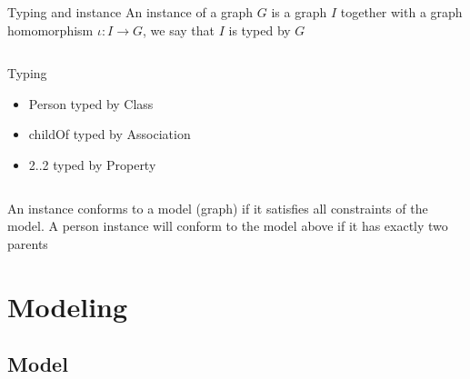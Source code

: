 \documentclass[slidetop,mathserif,red]{beamer}
\begin{document}
\begin{frame}{Typing and instance}
An instance of a graph $G$ is a graph $I$ together with a graph homomorphism $\iota:I \to G$, we say that $I$ is typed by $G$

    \begin{columns}[T]
    \begin{block}{Typing}
        \begin{itemize}
        \item Person typed by Class
        \item childOf typed by Association
        \item 2..2 typed by Property
        \end{itemize}
    \end{block}
   

  \end{columns}
\vspace{-3em}
An instance conforms to a model (graph) if it satisfies all constraints of the model.
A person instance will conform to the model above if it has exactly two parents

\end{frame}




















\section{Modeling}

\subsection{Model}
\end{document}
